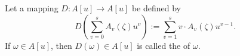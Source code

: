 Let a mapping $D: A[u] \to A[u]$ be defined by
$$D\left( \sum_{v=0}^{s} A_v(\zeta) u^v \right) := \sum_{v=1}^{s} v \cdot A_v(\zeta) u^{v-1}.$$
If $\omega \in A[u]$, then $D(\omega) \in A[u]$ is called the  of $\omega$.
